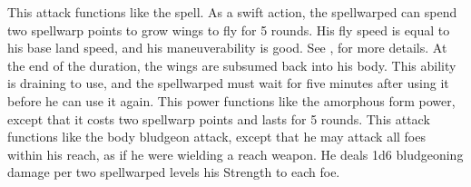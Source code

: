  This attack functions like the  spell.
 As a swift action, the spellwarped can spend two spellwarp points to grow wings to fly for 5 rounds. His fly speed is equal to his base land speed, and his maneuverability is good. See , for more details. At the end of the duration, the wings are subsumed back into his body. This ability is draining to use, and the spellwarped must wait for five minutes after using it before he can use it again.
 This power functions like the amorphous form power, except that it costs two spellwarp points and lasts for 5 rounds.
 This attack functions like the body bludgeon attack, except that he may attack all foes within his reach, as if he were wielding a reach weapon. He deals 1d6 bludgeoning damage per two spellwarped levels \add his Strength to each foe.


